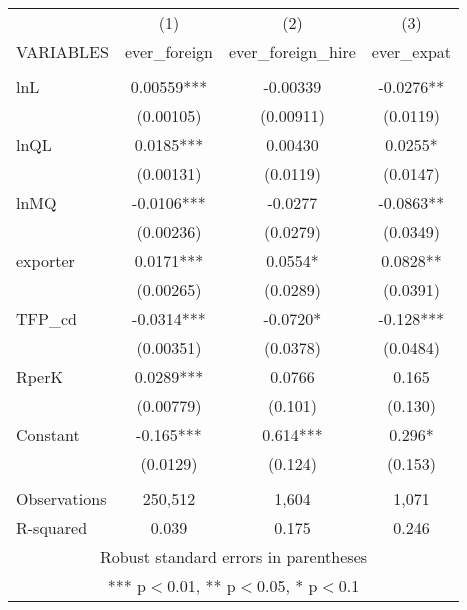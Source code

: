 \documentclass[]{article}
\begin{document}
\begin{tabular}{lccc} \hline
 & (1) & (2) & (3) \\
VARIABLES & ever\_foreign & ever\_foreign\_hire & ever\_expat \\ \hline
 &  &  &  \\
lnL & 0.00559*** & -0.00339 & -0.0276** \\
 & (0.00105) & (0.00911) & (0.0119) \\
lnQL & 0.0185*** & 0.00430 & 0.0255* \\
 & (0.00131) & (0.0119) & (0.0147) \\
lnMQ & -0.0106*** & -0.0277 & -0.0863** \\
 & (0.00236) & (0.0279) & (0.0349) \\
exporter & 0.0171*** & 0.0554* & 0.0828** \\
 & (0.00265) & (0.0289) & (0.0391) \\
TFP\_cd & -0.0314*** & -0.0720* & -0.128*** \\
 & (0.00351) & (0.0378) & (0.0484) \\
RperK & 0.0289*** & 0.0766 & 0.165 \\
 & (0.00779) & (0.101) & (0.130) \\
Constant & -0.165*** & 0.614*** & 0.296* \\
 & (0.0129) & (0.124) & (0.153) \\
 &  &  &  \\
Observations & 250,512 & 1,604 & 1,071 \\
 R-squared & 0.039 & 0.175 & 0.246 \\ \hline
\multicolumn{4}{c}{ Robust standard errors in parentheses} \\
\multicolumn{4}{c}{ *** p$<$0.01, ** p$<$0.05, * p$<$0.1} \\
\end{tabular}
\end{document}
